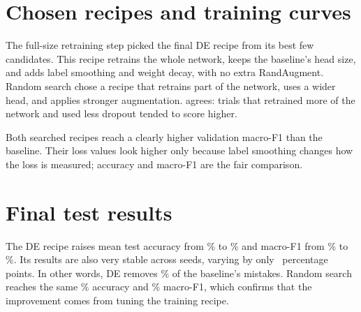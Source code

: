 

\section{Chosen recipes and training curves}
The full-size retraining step picked the final DE recipe from its best few candidates. This recipe retrains the whole network, keeps the baseline's head size, and adds label smoothing and weight decay, with no extra RandAugment. Random search chose a recipe that retrains part of the network, uses a wider head, and applies stronger augmentation.  agrees: trials that retrained more of the network and used less dropout tended to score higher.

Both searched recipes reach a clearly higher validation macro-F1 than the baseline. Their loss values look higher only because label smoothing changes how the loss is measured; accuracy and macro-F1 are the fair comparison.



\section{Final test results}
The DE recipe raises mean test accuracy from \BaseAcc\% to \DEAcc\% and macro-F1 from \BaseFone\% to \DEFone\%. Its results are also very stable across seeds, varying by only \DEStd\ percentage points. In other words, DE removes \ErrorReduction\% of the baseline's mistakes. Random search reaches the same \RSAcc\% accuracy and \RSFone\% macro-F1, which confirms that the improvement comes from tuning the training recipe.

